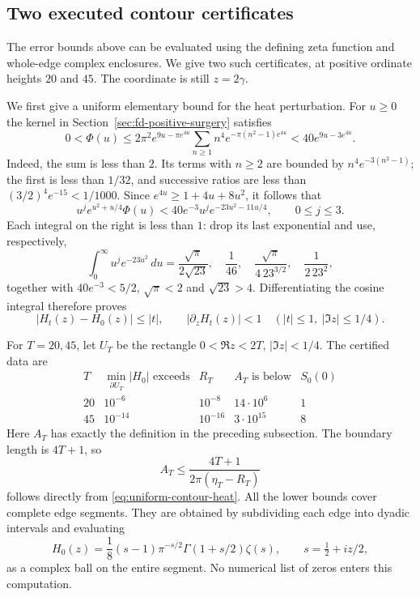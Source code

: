 \subsection{Two executed contour certificates}
\label{sec:executed-contour}
The error bounds above can be evaluated using the defining zeta
function and whole-edge complex enclosures. We give two such
certificates, at positive ordinate heights $20$ and $45$. The
coordinate is still $z=2\gamma$.

We first give a uniform elementary bound for the heat perturbation.
For $u\ge0$ the kernel in Section~\ref{sec:fd-positive-surgery} satisfies
\[
 0<\Phi(u)
 \le 2\pi^2 e^{9u-\pi e^{4u}}
       \sum_{n\ge1}n^4e^{-\pi(n^2-1)e^{4u}}
 <40e^{9u-3e^{4u}}.
\]
Indeed, the sum is less than $2$. Its terms with $n\ge2$ are
bounded by $n^4e^{-3(n^2-1)}$; the first is less than $1/32$,
and successive ratios are less than
$(3/2)^4e^{-15}<1/1000$. Since
$e^{4u}\ge1+4u+8u^2$, it follows that
\[
 u^j e^{u^2+u/4}\Phi(u)
 <40e^{-3}u^j e^{-23u^2-11u/4},\qquad 0\le j\le3.
\]
Each integral on the right is less than $1$: drop its last
exponential and use, respectively,
\[
 \int_0^\infty u^j e^{-23u^2}\,du
 =\frac{\sqrt\pi}{2\sqrt{23}},\quad
 \frac1{46},\quad
 \frac{\sqrt\pi}{4\,23^{3/2}},\quad
 \frac1{2\,23^2},
\]
together with $40e^{-3}<5/2$, $\sqrt\pi<2$ and
$\sqrt{23}>4$. Differentiating the cosine integral therefore proves
\begin{equation}\label{eq:uniform-contour-heat}
 |H_t(z)-H_0(z)|\le |t|,\qquad |\partial_zH_t(z)|<1
 \quad (|t|\le1,\ |\Im z|\le1/4).
\end{equation}

For $T=20,45$, let $U_T$ be the rectangle
$0<\Re z<2T$, $|\Im z|<1/4$. The certified data are
\[
\begin{array}{c|c|c|c|c}
 T&\min_{\partial U_T}|H_0|\text{ exceeds}&R_T&A_T\text{ is below}
       &S_0(0)\\ \hline
 20&10^{-6}&10^{-8}&14\cdot10^6&1\\
 45&10^{-14}&10^{-16}&3\cdot10^{15}&8
\end{array}
\]
Here $A_T$ has exactly the definition in the preceding subsection.
The boundary length is $4T+1$, so
\[
 A_T\le\frac{4T+1}{2\pi(\eta_T-R_T)}
\]
follows directly from \eqref{eq:uniform-contour-heat}. All the
lower bounds cover complete edge segments. They are obtained by
subdividing each edge into dyadic intervals and evaluating
\[
 H_0(z)=\frac18(s-1)\pi^{-s/2}\Gamma(1+s/2)\zeta(s),
 \qquad s=\tfrac12+iz/2,
\]
as a complex ball on the entire segment. No numerical list of zeros
enters this computation.

